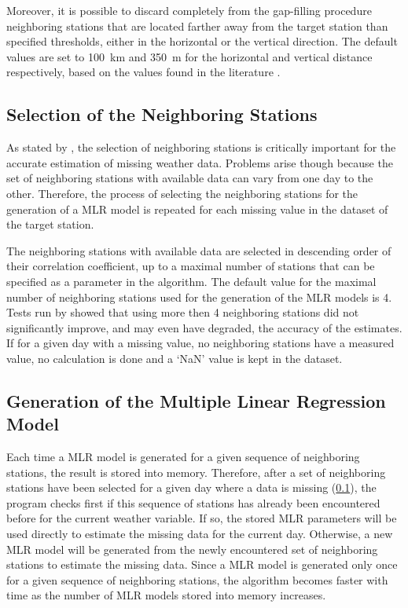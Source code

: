\documentclass[TechnicalNoteMeteo.tex]{subfiles}
\begin{document}
Moreover, it is possible to discard completely from the gap-filling procedure neighboring stations that are located farther away from the target station than specified thresholds, either in the horizontal or the vertical direction. The default values are set to \SI{100}{km} and \SI{350}{m} for the horizontal and vertical distance respectively, based on the values found in the literature \citep{tronci_comparison_1986,xia_forest_1999,simolo_improving_2010}.

\subsection{Selection of the Neighboring Stations}\label{sec:select_stations}

As stated by \cite{eischeid_creating_2000}, the selection of neighboring stations is critically important for the accurate estimation of missing weather data. Problems arise though because the set of neighboring stations with available data can vary from one day to the other. Therefore, the process of selecting the neighboring stations for the generation of a MLR model is repeated for each missing value in the dataset of the target station. 

The neighboring stations with available data are selected in descending order of their correlation coefficient, up to a maximal number of stations that can be specified as a parameter in the algorithm. The default value for the maximal number of neighboring stations used for the generation of the MLR models is 4. Tests run by \cite{eischeid_creating_2000} showed that using more then 4 neighboring stations did not significantly improve, and may even have degraded, the accuracy of the estimates. If for a given day with a missing value, no neighboring stations have a measured value, no calculation is done and a ‘NaN' value is kept in the dataset. 

\subsection{Generation of the Multiple Linear Regression Model}\label{subsec:MLR_gen}

Each time a MLR model is generated for a given sequence of neighboring stations, the result is stored into memory. Therefore, after a set of neighboring stations have been selected for a given day where a data is missing (\cref{sec:select_stations}), the program checks first if this sequence of stations has already been encountered before for the current weather variable. If so, the stored MLR parameters will be used directly to estimate the missing data for the current day. Otherwise, a new MLR model will be generated from the newly encountered set of neighboring stations to estimate the missing data. Since a MLR model is generated only once for a given sequence of neighboring stations, the algorithm becomes faster with time as the number of MLR models stored into memory increases.
\end{document}
